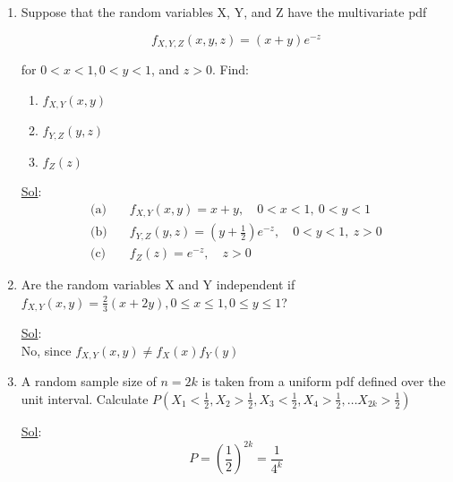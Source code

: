 \begin{enumerate}
    \[
      F_{X, Y} (x, y) = (1 - e^{- \lambda y}) (1 - e^{- \lambda x}),
      x > 0, y > 0
    \]

    \underline{Sol}: \\
    \[
      f_{X,Y}(x,y) =
      \begin{cases}
        \lambda^2 e^{-\lambda(x+y)}, & x>0,\ y>0 \\
        0, & \text{otherwise}
      \end{cases}
    \]

  \item[36.] Suppose that the random variables X, Y, and Z have the
    multivariate pdf

    \[
      f_{X, Y, Z} (x, y, z) = (x + y)e^{-z}
    \]

    for \(0 < x < 1, 0 < y < 1\), and \(z > 0\). Find:
    \begin{enumerate}
      \item \(f_{X, Y} (x, y)\)
      \item \(f_{Y, Z} (y, z)\)
      \item \(f_Z (z)\)
    \end{enumerate}

    \underline{Sol}: \\
    \[
      \begin{aligned}
        \text{(a)}&\quad f_{X,Y}(x,y) = x+y,\quad 0<x<1,\ 0<y<1 \\
        \text{(b)}&\quad f_{Y,Z}(y,z) =
        \left(y+\frac12\right)e^{-z},\quad 0<y<1,\ z>0 \\
        \text{(c)}&\quad f_Z(z) = e^{-z},\quad z>0
      \end{aligned}
    \]

  \item[42.] Are the random variables X and Y independent if \(f_{X,
    Y} (x, y) = \frac{2}{3} (x + 2y), 0 \leq x \leq 1, 0 \leq y \leq 1\)?

    \underline{Sol}: \\

    No, since \(f_{X, Y} (x, y) \ne f_X(x) f_Y(y)\)

  \item[52.] A random sample size of \(n = 2k\) is taken from a
    uniform pdf defined over the unit interval. Calculate \( P(X_1 <
        \frac{1}{2}, X_2 > \frac{1}{2}, X_3 < \frac{1}{2}, X_4 >
    \frac{1}{2}, \dots X_{2k} > \frac{1}{2}) \)

    \underline{Sol}: \\
    \[
      P = \left(\frac{1}{2}\right)^{2k} = \frac{1}{4^k}
    \]
\end{enumerate}
